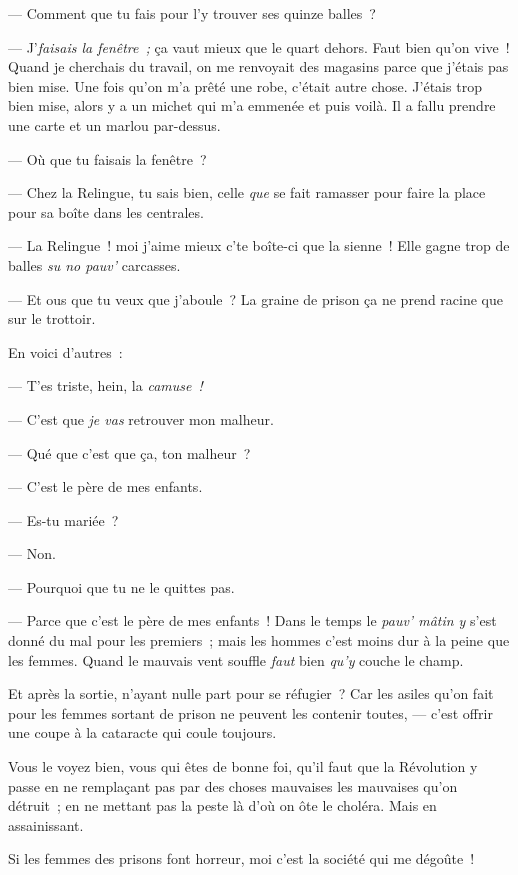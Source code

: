 \documentclass[french,twoside]{book} %
\begin{document}
— Comment que tu fais pour l’y trouver ses quinze balles ?\par
— J’\emph{faisais la fenêtre ;} ça vaut mieux que le quart dehors. Faut bien qu’on vive ! Quand je cherchais du travail, on me renvoyait des magasins parce que j’étais pas bien mise. Une fois qu’on m’a prêté une robe, c’était autre chose. J’étais trop bien mise, alors y a un michet qui m’a emmenée et puis voilà. Il a fallu prendre une carte et un marlou par-dessus.\par
— Où que tu faisais la fenêtre ?\par
— Chez la Relingue, tu sais bien, celle \emph{que} se fait ramasser pour faire la place pour sa boîte dans les centrales.\par
— La Relingue ! moi j’aime mieux c’te boîte-ci  que la sienne ! Elle gagne trop de balles \emph{su no pauv’} carcasses.\par
— Et ous que tu veux que j’aboule ? La graine de prison ça ne prend racine que sur le trottoir.\par
\bigbreak
\noindent En voici d’autres :\par
\bigbreak
\noindent — T’es triste, hein, la \emph{camuse !}\par
— C’est que \emph{je vas} retrouver mon malheur.\par
— Qué que c’est que ça, ton malheur ?\par
— C’est le père de mes enfants.\par
— Es-tu mariée ?\par
— Non.\par
— Pourquoi que tu ne le quittes pas.\par
— Parce que c’est le père de mes enfants ! Dans le temps le \emph{pauv’ mâtin y} s’est donné du mal pour les premiers ; mais les hommes c’est moins dur à la peine que les femmes. Quand le mauvais vent souffle \emph{faut} bien \emph{qu’y} couche le champ.\par
\bigbreak
\noindent Et après la sortie, n’ayant nulle part pour se réfugier ? Car les asiles qu’on fait pour les femmes sortant de prison ne peuvent les contenir toutes, — c’est offrir une coupe à la cataracte qui coule toujours.\par
Vous le voyez bien, vous qui êtes de bonne foi, qu’il faut que la Révolution y passe en ne remplaçant pas par des choses mauvaises les  mauvaises qu’on détruit ; en ne mettant pas la peste là d’où on ôte le choléra. Mais en assainissant.\par
Si les femmes des prisons font horreur, moi c’est la société qui me dégoûte !\par
\end{document}
